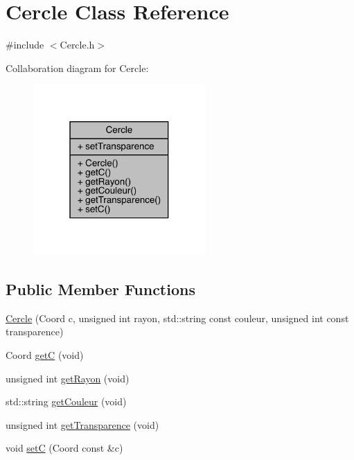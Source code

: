 \hypertarget{class_cercle}{}\section{Cercle Class Reference}
\label{class_cercle}


{\ttfamily \#include $<$Cercle.\+h$>$}



Collaboration diagram for Cercle\+:
\nopagebreak
\begin{figure}[H]
\begin{center}
\leavevmode
\includegraphics[width=187pt]{class_cercle__coll__graph}
\end{center}
\end{figure}
\subsection*{Public Member Functions}
\begin{DoxyCompactItemize}
\item 
\hyperlink{class_cercle_a91f80bb4ad0daa84b036d94f87dc9351}{Cercle} (Coord c, unsigned int rayon, std\+::string const couleur, unsigned int const transparence)
\item 
Coord \hyperlink{class_cercle_a6f472f414ad785c4585d7b4139266d27}{getC} (void)
\item 
unsigned int \hyperlink{class_cercle_abd14abcaf33d352ea2fb172256756b67}{get\+Rayon} (void)
\item 
std\+::string \hyperlink{class_cercle_a22efe054905d7f7c0f75a42c8c618c65}{get\+Couleur} (void)
\item 
unsigned int \hyperlink{class_cercle_afc9c34b452c3bf951aa910301a84bb01}{get\+Transparence} (void)
\item 
void \hyperlink{class_cercle_ae77c3c453c982054ed3c56656f2596e4}{setC} (Coord const \&c)
\end{DoxyCompactItemize}
